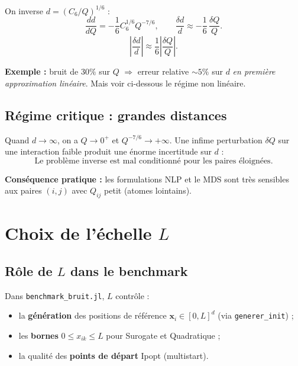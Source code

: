 \documentclass[12pt,a4paper]{article}
\begin{document}
On inverse $d = (C_6/Q)^{1/6}$ :
\[
  \frac{dd}{dQ} = -\frac{1}{6} C_6^{1/6} Q^{-7/6},
  \qquad
  \frac{\delta d}{d} \approx -\frac{1}{6}\,\frac{\delta Q}{Q}.
\]
\begin{equation}\label{eq:sens-inverse}
  \boxed{\left|\frac{\delta d}{d}\right| \approx \frac{1}{6}\left|\frac{\delta Q}{Q}\right|.}
\end{equation}

\textbf{Exemple :} bruit de $30\%$ sur $Q$ $\Rightarrow$ erreur relative
$\sim 5\%$ sur $d$ \emph{en première approximation linéaire}.
Mais voir ci-dessous le régime non linéaire.

\subsection{Régime critique : grandes distances}

Quand $d \to \infty$, on a $Q \to 0^+$ et $Q^{-7/6} \to +\infty$.
Une infime perturbation $\delta Q$ sur une interaction faible produit
une énorme incertitude sur $d$ :
\[
  \boxed{\text{Le problème inverse est mal conditionné pour les paires éloignées.}}
\]

\textbf{Conséquence pratique :} les formulations NLP et le MDS sont très
sensibles aux paires $(i,j)$ avec $Q_{ij}$ petit (atomes lointains).

\section{Choix de l'échelle $L$}

\subsection{Rôle de $L$ dans le benchmark}

Dans \texttt{benchmark\_bruit.jl}, $L$ contrôle :
\begin{itemize}[leftmargin=2em]
  \item la \textbf{génération} des positions de référence
    $\mathbf{x}_i \in [0,L]^d$ (via \texttt{generer\_init}) ;
  \item les \textbf{bornes} $0 \leq x_{ik} \leq L$ pour Surogate et Quadratique ;
  \item la qualité des \textbf{points de départ} Ipopt (multistart).
\end{itemize}
\end{document}
